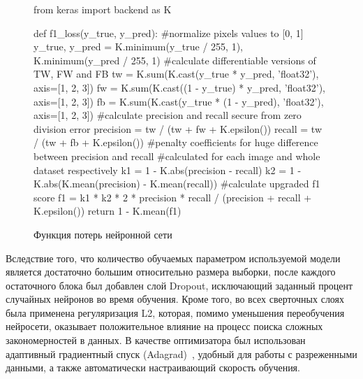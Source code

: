 \begin{figure}[h]
\begin{center}
\centering
\begin{python}
from keras import backend as K

def f1_loss(y_true, y_pred):
    #normalize pixels values to [0, 1]
    y_true, y_pred = K.minimum(y_true / 255, 1), K.minimum(y_pred / 255, 1)
    #calculate differentiable versions of TW, FW and FB
    tw = K.sum(K.cast(y_true * y_pred, 'float32'), axis=[1, 2, 3])
    fw = K.sum(K.cast((1 - y_true) * y_pred, 'float32'), axis=[1, 2, 3])
    fb = K.sum(K.cast(y_true * (1 - y_pred), 'float32'), axis=[1, 2, 3])
    #calculate precision and recall secure from zero division error
    precision = tw / (tw + fw + K.epsilon())
    recall = tw / (tw + fb + K.epsilon())
    #penalty coefficients for huge difference between precision and recall 
    #calculated for each image and whole dataset respectively
    k1 = 1 -  K.abs(precision - recall)
    k2 = 1 -  K.abs(K.mean(precision) - K.mean(recall))
    #calculate upgraded f1 score
    f1 = k1 * k2 * 2 * precision * recall / (precision + recall + K.epsilon()) 
    return 1 - K.mean(f1)
\end{python}
\caption{Функция потерь нейронной сети}
\label{loss}
\end{center}
\end{figure} 

Вследствие того, что количество обучаемых параметром используемой модели является достаточно большим относительно размера выборки, после каждого остаточного блока был добавлен слой Dropout, исключающий заданный процент случайных нейронов во время обучения. Кроме того, во всех сверточных слоях была применена регуляризация L2, которая, помимо уменьшения переобучения нейросети, оказывает положительное влияние на процесс поиска сложных закономерностей в данных. В качестве оптимизатора был использован адаптивный градиентный спуск (Adagrad)~\cite{duchi2011adaptive}, удобный для работы с разреженными данными, а также автоматически настраивающий скорость обучения.

